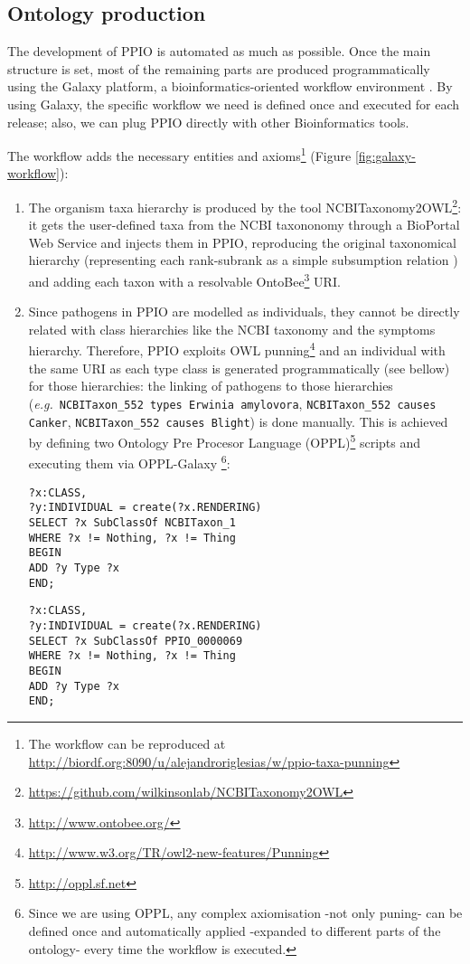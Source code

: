 \documentclass[sw]{iosart2c}
\newcommand{\myurl}[1]{\footnote{\url{#1}}}
\newcommand{\eg}{\emph{e.g.}\xspace}
\newcommand{\con}[1]{\texttt{#1}\xspace}
\begin{document}
\subsection{Ontology production}
The development of PPIO is automated as much as possible. Once the main structure is set, most of the remaining parts are produced programmatically using the Galaxy platform, a bioinformatics-oriented workflow environment \cite{galaxy}. By using Galaxy, the specific workflow we need is defined once and executed for each release; also, we can plug PPIO directly with other Bioinformatics tools. 

The workflow adds the necessary entities and axioms\footnote{The workflow can be reproduced at \url{http://biordf.org:8090/u/alejandroriglesias/w/ppio-taxa-punning}} (Figure \ref{fig:galaxy-workflow}):

\begin{enumerate}

\item The organism taxa hierarchy is produced by the tool NCBITaxonomy2OWL\myurl{https://github.com/wilkinsonlab/NCBITaxonomy2OWL}: it gets the user-defined taxa from the NCBI taxononomy through a BioPortal Web Service \cite{bioportal} and injects them in PPIO, reproducing the original taxonomical hierarchy (representing each rank-subrank as a simple subsumption relation \cite{taxa_ismb_2008}) and adding each taxon with a resolvable OntoBee\myurl{http://www.ontobee.org/} URI.

\item Since pathogens in PPIO are modelled as individuals, they cannot be directly related with class hierarchies like the NCBI taxonomy and the symptoms hierarchy. Therefore, PPIO exploits OWL punning\myurl{http://www.w3.org/TR/owl2-new-features/Punning} and an individual with the same URI as each type class is generated programmatically (see bellow) for those hierarchies: the linking of pathogens to those hierarchies (\eg~\con{NCBITaxon\_552 types Erwinia amylovora}, \con{NCBITaxon\_552 causes Canker}, \con{NCBITaxon\_552 causes Blight}) is done manually. This is achieved by defining two Ontology Pre Procesor Language (OPPL)\myurl{http://oppl.sf.net} scripts and executing them via OPPL-Galaxy \cite{OPPL-Galaxy-JBMS}\footnote{Since we are using OPPL, any complex axiomisation -not only puning- can be defined once and automatically applied -expanded to different parts of the ontology- every time the workflow is executed.}:

{\small 
\begin{verbatim}
?x:CLASS,
?y:INDIVIDUAL = create(?x.RENDERING)
SELECT ?x SubClassOf NCBITaxon_1
WHERE ?x != Nothing, ?x != Thing
BEGIN
ADD ?y Type ?x
END;
\end{verbatim}
}

{\small 
\begin{verbatim}
?x:CLASS,
?y:INDIVIDUAL = create(?x.RENDERING)
SELECT ?x SubClassOf PPIO_0000069
WHERE ?x != Nothing, ?x != Thing
BEGIN
ADD ?y Type ?x
END;
\end{verbatim}
}


\end{enumerate}
\end{document}
